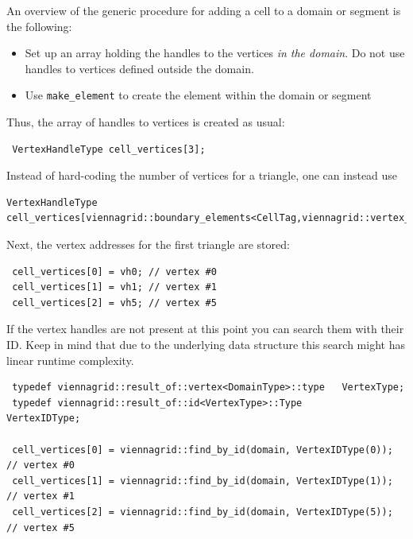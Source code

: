 

An overview of the generic procedure for adding a cell to a domain or segment is the following:
  \begin{itemize}
   \item Set up an array holding the handles to the vertices \emph{in the domain}. Do not use handles to vertices defined outside the domain.
   \item Use \lstinline|make_element| to create the element within the domain or segment
  \end{itemize}
Thus, the array of handles to vertices is created as usual:
\begin{lstlisting}
 VertexHandleType cell_vertices[3];
\end{lstlisting}
Instead of hard-coding the number of vertices for a triangle, one can instead use 
\begin{lstlisting}
VertexHandleType cell_vertices[viennagrid::boundary_elements<CellTag,viennagrid::vertex_tag>::num];
\end{lstlisting}


Next, the vertex addresses for the first triangle are stored:
\begin{lstlisting}
 cell_vertices[0] = vh0; // vertex #0
 cell_vertices[1] = vh1; // vertex #1
 cell_vertices[2] = vh5; // vertex #5
\end{lstlisting}


If the vertex handles are not present at this point you can search them with their ID. Keep in mind that due to the underlying data structure this search might has linear runtime complexity.
\begin{lstlisting}
 typedef viennagrid::result_of::vertex<DomainType>::type   VertexType;
 typedef viennagrid::result_of::id<VertexType>::Type       VertexIDType;
 
 cell_vertices[0] = viennagrid::find_by_id(domain, VertexIDType(0)); // vertex #0
 cell_vertices[1] = viennagrid::find_by_id(domain, VertexIDType(1)); // vertex #1
 cell_vertices[2] = viennagrid::find_by_id(domain, VertexIDType(5)); // vertex #5
\end{lstlisting}

